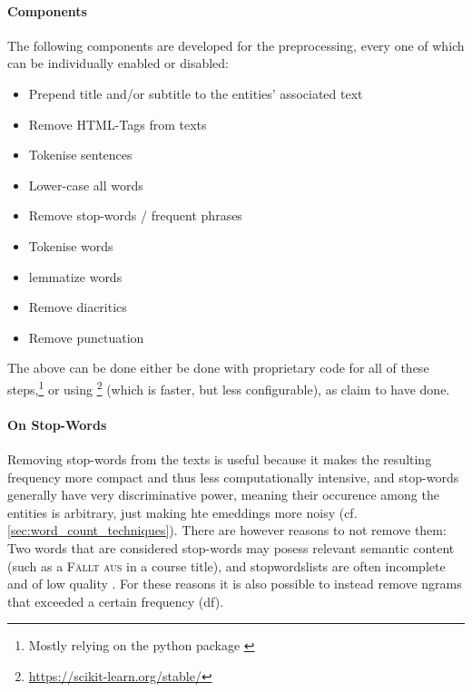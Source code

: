 \paragraph{Components} The following components are developed for the preprocessing, every one of which can be individually enabled or disabled:

\begin{itemize}
	\item Prepend title and/or subtitle to the entities' associated text 
	\item Remove HTML-Tags from texts 
	\item Tokenise sentences 
	\item Lower-case all words
	\item Remove stop-words / frequent phrases
	\item Tokenise words
	\item \Gls{lemma}tize words
	\item Remove diacritics
	\item Remove punctuation 
\end{itemize}

The above can be done either be done with proprietary code for all of these steps,\footnote{Mostly relying on the python package  \cite{bird2009natural}} or using \footnote{\url{https://scikit-learn.org/stable/}}  (which is faster, but less configurable), as \cite{Ager2018} claim to have done.

\paragraph{On Stop-Words}
Removing stop-words from the texts is useful because it makes the resulting frequency more compact and thus less computationally intensive, and stop-words generally have very discriminative power, meaning their occurence among the entities is arbitrary, just making hte emeddings more noisy (cf. \autoref{sec:word_count_techniques}). There are however reasons to not remove them: Two words that are considered stop-words may posess relevant semantic content (such as a \textsc{Fällt aus} in a course title), and stopwordslists are often incomplete and of low quality \cite{nothman-etal-2018-stop}. For these reasons it is also possible to instead remove \glspl{ngram} that exceeded a certain frequency (\gls{df}).

